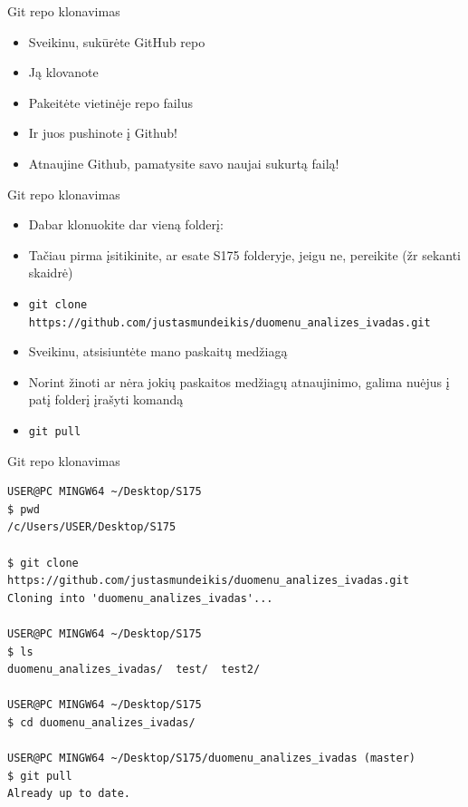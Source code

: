 \documentclass[11pt,xcolor=table]{beamer}
\begin{document}

\begin{frame}[fragile]{Git repo klonavimas}
\begin{itemize}
\item Sveikinu, sukūrėte GitHub repo
\item Ją klovanote
\item Pakeitėte vietinėje repo failus
\item Ir juos pushinote į Github!
\item Atnaujine Github, pamatysite savo naujai sukurtą failą!
\end{itemize}
\end{frame}

\begin{frame}{Git repo klonavimas}
\begin{itemize}
\item Dabar klonuokite dar vieną folderį:
\item Tačiau pirma įsitikinite, ar esate S175 folderyje, jeigu ne, pereikite (žr sekanti skaidrė)
\item \colorbox{listinggray}{\lstinline|git clone https://github.com/justasmundeikis/duomenu_analizes_ivadas.git|}
\item Sveikinu, atsisiuntėte mano paskaitų medžiagą
\item Norint žinoti ar nėra jokių paskaitos medžiagų atnaujinimo, galima nuėjus į patį folderį įrašyti komandą
\item \colorbox{listinggray}{\lstinline|git pull|} 
\end{itemize}
\end{frame}


\begin{frame}[fragile]{Git repo klonavimas}
\begin{lstlisting}
USER@PC MINGW64 ~/Desktop/S175
$ pwd
/c/Users/USER/Desktop/S175

$ git clone https://github.com/justasmundeikis/duomenu_analizes_ivadas.git
Cloning into 'duomenu_analizes_ivadas'...

USER@PC MINGW64 ~/Desktop/S175
$ ls
duomenu_analizes_ivadas/  test/  test2/

USER@PC MINGW64 ~/Desktop/S175
$ cd duomenu_analizes_ivadas/

USER@PC MINGW64 ~/Desktop/S175/duomenu_analizes_ivadas (master)
$ git pull
Already up to date.
\end{lstlisting}

\end{frame}
\end{document}
